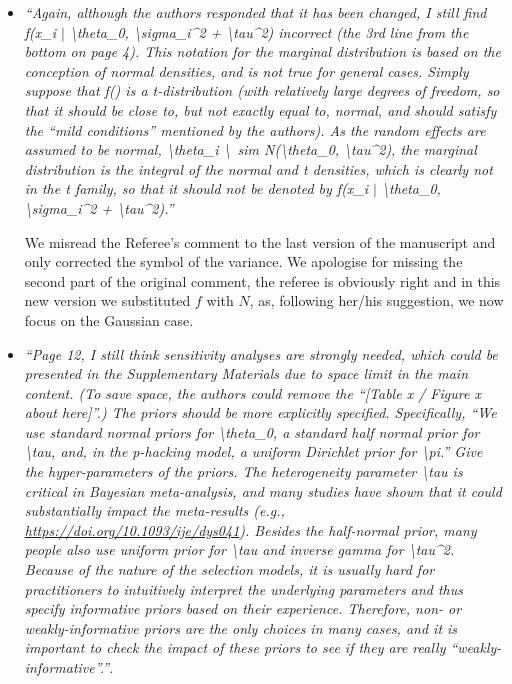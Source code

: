 \documentclass[11pt]{article}
\begin{document}
\begin{itemize}
\item \emph{``Again, although the authors responded that it has been changed, I still find f(x\_i $\mid$ \textbackslash theta\_0, \textbackslash sigma\_i\^{}2 + \textbackslash tau\^{}2) incorrect (the 3rd line from the bottom on page 4). This notation for the marginal distribution is based on the conception of normal densities, and is not true for general cases. Simply suppose that f() is a t-distribution (with relatively large degrees of freedom, so that it should be close to, but not exactly equal to, normal, and should satisfy the “mild conditions” mentioned by the authors). As the random effects are assumed to be normal, \textbackslash theta\_i \textbackslash\ sim N(\textbackslash theta\_0, \textbackslash tau\^{}2), the marginal distribution is the integral of the normal and t densities, which is clearly not in the t family, so that it should not be denoted by f(x\_i $\mid$ \textbackslash theta\_0, \textbackslash sigma\_i\^{}2 + \textbackslash tau\^{}2).''}

We misread the Referee's comment to the last version of the manuscript and only corrected the symbol of the variance. We apologise for missing the second part of the original comment, the referee is obviously right and in this new version we substituted $f$ with $N$, as, following her/his suggestion, we now focus on the Gaussian case.\\


\item \emph{``Page 12, I still think sensitivity analyses are strongly needed, which could be presented in the Supplementary Materials due to space limit in the main content. (To save space, the authors could remove the ``[Table x / Figure x about here]''.) The priors should be more explicitly specified. Specifically, ``We use standard normal priors for \textbackslash theta\_0, a standard half normal prior for \textbackslash tau, and, in the p-hacking model, a uniform Dirichlet prior for \textbackslash pi.'' Give the hyper-parameters of the priors. The heterogeneity parameter \textbackslash tau is critical in Bayesian meta-analysis, and many studies have shown that it could substantially impact the meta-results (e.g., \url{https://doi.org/10.1093/ije/dys041}). Besides the half-normal prior, many people also use uniform prior for \textbackslash tau and inverse gamma for \textbackslash tau\^{}2. Because of the nature of the selection models, it is usually hard for practitioners to intuitively interpret the underlying parameters and thus specify informative priors based on their experience. Therefore, non- or weakly-informative priors are the only choices in many cases, and it is important to check the impact of these priors to see if they are really ``weakly-informative''.''}.


\end{itemize}
\end{document}

